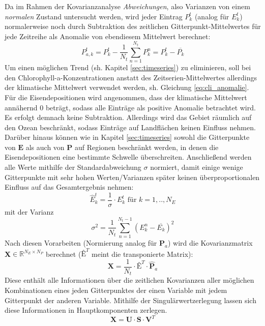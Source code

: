 \documentclass[12pt,a4paper,onecolumn]{scrartcl}
\begin{document}
Da im Rahmen der Kovarianzanalyse \textit{Abweichungen}, also Varianzen von einem \textit{normalen} Zustand untersucht werden, wird jeder Eintrag $P_k^t$ (analog für $E_k^t$) normalerweise noch durch Subtraktion des zeitlichen Gitterpunkt-Mittelwertes für jede Zeitreihe als Anomalie von ebendiesem Mittelwert berechnet:
\begin{equation}
P_{a,k}^t = P_k^t - \frac{1}{N_t} \sum\limits_{n=1}^{N_t} P_k^n = P_k^t - \overline{P_k}
\end{equation}
Um einen möglichen Trend (sh. Kapitel \ref{sec:timeseries}) zu eliminieren, soll bei den Chlorophyll-a-Konzentrationen anstatt des Zeitserien-Mittelwertes allerdings der klimatische Mittelwert verwendet werden, sh. Gleichung \ref{eq:cli_anomalie}. Für die Eisendepositionen wird angenommen, dass der klimatische Mittelwert annähernd 0 beträgt, sodass alle Einträge als positive Anomalie betrachtet wird. Es erfolgt demnach keine Subtraktion. Allerdings wird das Gebiet räumlich auf den Ozean beschränkt, sodass Einträge auf Landflächen keinen Einfluss nehmen. Darüber hinaus können wie in Kapitel \ref{sec:timeseries} sowohl die Gitterpunkte von $\textbf{E}$ als auch von $\textbf{P}$ auf Regionen beschränkt werden, in denen die Eisendepositionen eine bestimmte Schwelle überschreiten. Anschließend werden alle Werte mithilfe der Standardabweichung $\sigma$ normiert, damit einige wenige Gitterpunkte mit sehr hohen Werten/Varianzen später keinen überproportionalen Einfluss auf das Gesamtergebnis nehmen:
\begin{equation}
\hat{E}_k^t =  \frac{1}{\sigma} \cdot E_k^t \text{ für } k = 1,..,N_E 
\end{equation}
mit der Varianz
\begin{equation}
\sigma^2 = \frac{1}{N_t} \sum\limits_{n=1}^{N_t-1}(E_k^n-\overline{E_k})^2
\end{equation}
Nach diesen Vorarbeiten (Normierung analog für \textbf{P}$_a$) wird die Kovarianzmatrix \textbf{X}$\in \mathbb{R}^{N_E \times N_P}$ berechnet ($\textbf{\^{E}}^T$ meint die transponierte Matrix):
\begin{equation}
\textbf{X} = \frac{1}{N_t} \cdot \textbf{\^{E}}^T \cdot \hat{\textbf{P}}_a
\end{equation}
Diese enthält alle Informationen über die zeitlichen Kovarianzen aller möglichen Kombinationen eines jeden Gitterpunktes der einen Variable mit jedem Gitterpunkt der anderen Variable. Mithilfe der Singulärwertzerlegung lassen sich diese Informationen in Hauptkomponenten zerlegen.
\begin{equation}
\textbf{X} = \textbf{U} \cdot \textbf{S} \cdot \textbf{V}^T
\end{equation}
\end{document}
